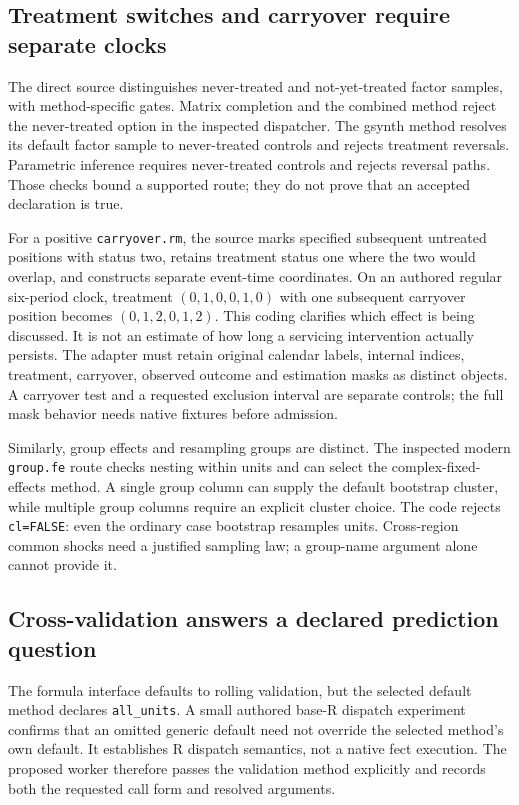 \subsection{Treatment switches and carryover require separate clocks}
The direct source distinguishes never-treated and not-yet-treated factor
samples, with method-specific gates. Matrix completion and the combined
method reject the never-treated option in the inspected dispatcher.
The gsynth method resolves its default factor sample to never-treated
controls and rejects treatment reversals. Parametric inference requires
never-treated controls and rejects reversal paths. Those checks bound a
supported route; they do not prove that an accepted declaration is true.
\citep{exec24_fect_source}

For a positive \texttt{carryover.rm}, the source marks specified subsequent
untreated positions with status two, retains treatment status one where
the two would overlap, and constructs separate event-time coordinates.
On an authored regular six-period clock, treatment $(0,1,0,0,1,0)$ with
one subsequent carryover position becomes $(0,1,2,0,1,2)$. This coding
clarifies which effect is being discussed. It is not an estimate of how
long a servicing intervention actually persists. The adapter must retain
original calendar labels, internal indices, treatment, carryover, observed
outcome and estimation masks as distinct objects. A carryover test and a
requested exclusion interval are separate controls; the full mask behavior
needs native fixtures before admission.~\citep{exec24_fect_source,exec24_fect_choice}

Similarly, group effects and resampling groups are distinct. The inspected
modern \texttt{group.fe} route checks nesting within units and can select
the complex-fixed-effects method. A single group column can supply the
default bootstrap cluster, while multiple group columns require an
explicit cluster choice. The code rejects \texttt{cl=FALSE}: even the
ordinary case bootstrap resamples units. Cross-region common shocks need
a justified sampling law; a group-name argument alone cannot provide it.
\citep{exec24_fect_source}

\subsection{Cross-validation answers a declared prediction question}
The formula interface defaults to rolling validation, but the selected
default method declares \texttt{all\_units}. A small authored base-R
dispatch experiment confirms that an omitted generic default need not
override the selected method's own default. It establishes R dispatch
semantics, not a native fect execution. The proposed worker therefore
passes the validation method explicitly and records both the requested
call form and resolved arguments.~\citep{exec24_fect_source,exec24_fect_choice}

